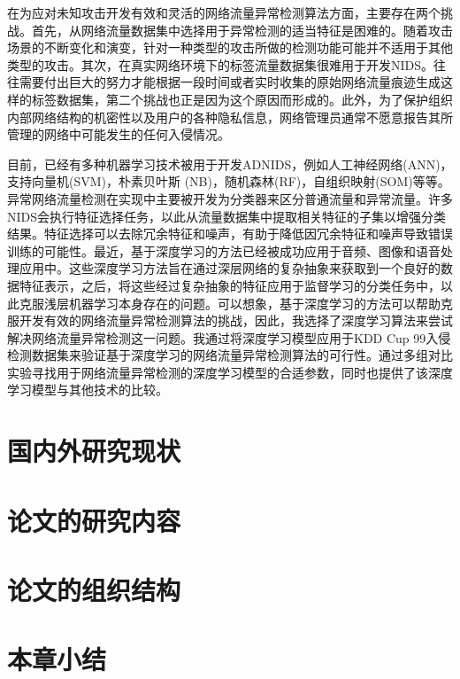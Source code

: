 在为应对未知攻击开发有效和灵活的网络流量异常检测算法方面，主要存在两个挑战。首先，从网络流量数据集中选择用于异常检测的适当特征是困难的。随着攻击场景的不断变化和演变，针对一种类型的攻击所做的检测功能可能并不适用于其他类型的攻击。其次，在真实网络环境下的标签流量数据集很难用于开发NIDS。往往需要付出巨大的努力才能根据一段时间或者实时收集的原始网络流量痕迹生成这样的标签数据集，第二个挑战也正是因为这个原因而形成的。此外，为了保护组织内部网络结构的机密性以及用户的各种隐私信息，网络管理员通常不愿意报告其所管理的网络中可能发生的任何入侵情况。

目前，已经有多种机器学习技术被用于开发ADNIDS，例如人工神经网络(ANN)，支持向量机(SVM)，朴素贝叶斯 (NB)，随机森林(RF)，自组织映射(SOM)等等。异常网络流量检测在实现中主要被开发为分类器来区分普通流量和异常流量。许多NIDS会执行特征选择任务，以此从流量数据集中提取相关特征的子集以增强分类结果。特征选择可以去除冗余特征和噪声，有助于降低因冗余特征和噪声导致错误训练的可能性。最近，基于深度学习的方法已经被成功应用于音频、图像和语音处理应用中。这些深度学习方法旨在通过深层网络的复杂抽象来获取到一个良好的数据特征表示，之后，将这些经过复杂抽象的特征应用于监督学习的分类任务中，以此克服浅层机器学习本身存在的问题。可以想象，基于深度学习的方法可以帮助克服开发有效的网络流量异常检测算法的挑战，因此，我选择了深度学习算法来尝试解决网络流量异常检测这一问题。我通过将深度学习模型应用于KDD Cup 99入侵检测数据集来验证基于深度学习的网络流量异常检测算法的可行性。通过多组对比实验寻找用于网络流量异常检测的深度学习模型的合适参数，同时也提供了该深度学习模型与其他技术的比较。

\section{国内外研究现状}
\section{论文的研究内容}
\section{论文的组织结构}
\section{本章小结}
